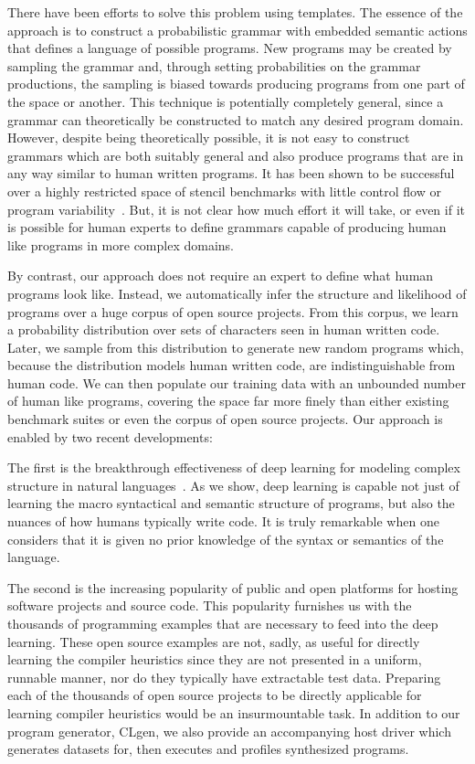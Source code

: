 There have been efforts to solve this problem using templates. The essence of the approach is to construct a probabilistic grammar with embedded semantic actions that defines a language of possible programs. New programs may be created by sampling the grammar and, through setting probabilities on the grammar productions, the sampling is biased towards producing programs from one part of the space or another. This technique is potentially completely general, since a grammar can theoretically be constructed to match any desired program domain. However, despite being theoretically possible, it is not easy to construct grammars which are both suitably general and also produce programs that are in any way similar to human written programs. It has been shown to be successful over a highly restricted space of stencil benchmarks with little control flow or program variability~\cite{Falch2015,Cummins2016}. But, it is not clear how much effort it will take, or even if it is possible for human experts to define grammars capable of producing human like programs in more complex domains.

By contrast, our approach does not require an expert to define what human programs look like. Instead, we automatically infer the structure and likelihood of programs over a huge corpus of open source projects. From this corpus, we learn a probability distribution over sets of characters seen in human written code. Later, we sample from this distribution to generate new random programs which, because the distribution models human written code, are indistinguishable from human code. We can then populate our training data with an unbounded number of human like programs, covering the space far more finely than either existing benchmark suites or even the corpus of open source projects. Our approach is enabled by two recent developments:

The first is the breakthrough effectiveness of deep learning for modeling complex structure in natural languages~\cite{Graves2013,Sutskever2014}. As we show, deep learning is capable not just of learning the macro syntactical and semantic structure of programs, but also the nuances of how humans typically write code. It is truly remarkable when one considers that it is given no prior knowledge of the syntax or semantics of the language.

The second is the increasing popularity of public and open platforms for hosting software projects and source code. This popularity furnishes us with the thousands of programming examples that are necessary to feed into the deep learning. These open source examples are not, sadly, as useful for directly learning the compiler heuristics since they are not presented in a uniform, runnable manner, nor do they typically have extractable test data. Preparing each of the thousands of open source projects to be directly applicable for learning compiler heuristics would be an insurmountable task. In addition to our program generator, CLgen, we also provide an accompanying host driver which generates datasets for, then executes and profiles synthesized programs.

